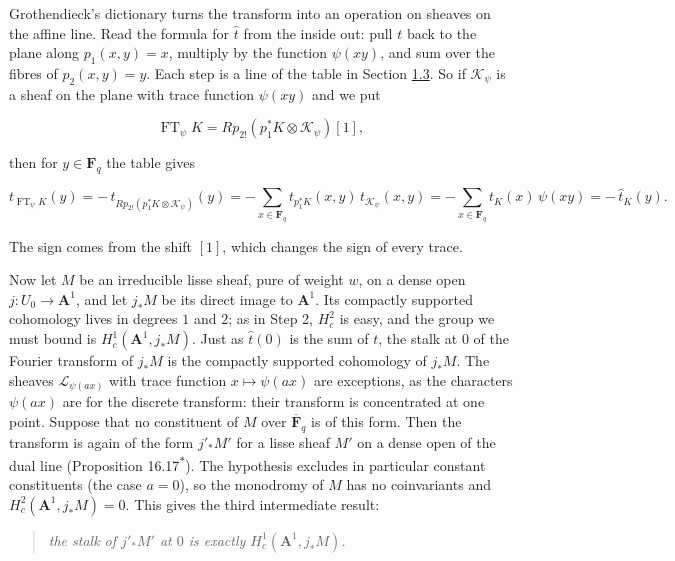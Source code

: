 \documentclass[11pt]{article}
\newcommand{\bpout}[1]{#1\textsuperscript{\hyperlink{bp-outside}{\ensuremath{\ast}}}}
\begin{document}
Grothendieck's dictionary turns the transform into an operation on sheaves on the affine line. Read the formula for \(\hat t\) from the inside out: pull \(t\) back to the plane along \(p_1(x,y)=x\), multiply by the function \(\psi(xy)\), and sum over the fibres of \(p_2(x,y)=y\). Each step is a line of the table in Section \hyperref[bp7]{1.3}. So if \(\mathcal K_\psi\) is a sheaf on the plane with trace function \(\psi(xy)\) and we put

\[
\operatorname{FT}_\psi K=Rp_{2!}(p_1^*K\otimes\mathcal K_\psi)[1],
\]

then for \(y\in\mathbf F_q\) the table gives

\[
t_{\operatorname{FT}_\psi K}(y)
=-\,t_{Rp_{2!}(p_1^*K\otimes\mathcal K_\psi)}(y)
=-\sum_{x\in\mathbf F_q}t_{p_1^*K}(x,y)\,t_{\mathcal K_\psi}(x,y)
=-\sum_{x\in\mathbf F_q}t_K(x)\,\psi(xy)
=-\,\hat t_K(y).
\]

The sign comes from the shift \([1]\), which changes the sign of every trace.

Now let \(M\) be an irreducible lisse sheaf, pure of weight \(w\), on a dense open \(j:U_0\to\mathbf A^1\), and let \(j_*M\) be its direct image to \(\mathbf A^1\). Its compactly supported cohomology lives in degrees \(1\) and \(2\); as in Step 2, \(H^2_c\) is easy, and the group we must bound is \(H^1_c(\mathbf A^1,j_*M)\). Just as \(\hat t(0)\) is the sum of \(t\), the stalk at \(0\) of the Fourier transform of \(j_*M\) is the compactly supported cohomology of \(j_*M\). The sheaves \(\mathcal L_{\psi(ax)}\) with trace function \(x\mapsto\psi(ax)\) are exceptions, as the characters \(\psi(ax)\) are for the discrete transform: their transform is concentrated at one point. Suppose that no constituent of \(M\) over \(\overline{\mathbf F}_q\) is of this form. Then the transform is again of the form \(j'_*M'\) for a lisse sheaf \(M'\) on a dense open of the dual line (Proposition \bpout{16.17}). The hypothesis excludes in particular constant constituents (the case \(a=0\)), so the monodromy of \(M\) has no coinvariants and \(H^2_c(\mathbf A^1,j_*M)=0\). This gives the third intermediate result:

\begin{quote}
\emph{the stalk of \(j'_*M'\) at \(0\) is exactly \(H^1_c(\mathbf A^1,j_*M)\).}
\end{quote}
\end{document}
